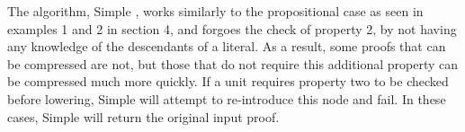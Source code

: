 The algorithm, Simple \FOLowerUnits, works similarly to the propositional case as seen in examples 1 and 2 in section 4, and forgoes the check of property 2, by not having any knowledge of the descendants of a literal. As a result, some proofs that can be compressed are not, but those that do not require this additional property can be compressed much more quickly. If a unit requires property two to be checked before lowering, Simple {\FOLowerUnits} will attempt to re-introduce this node and fail. In these cases, Simple \FOLowerUnits will return the original input proof.

